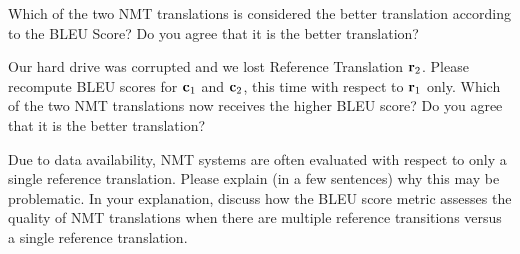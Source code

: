 \begin{parts}
\begin{subparts}
        Which of the two NMT translations is considered the better translation according to the BLEU Score? Do you agree that it is the better translation?
        
        \subpart[5] Our hard drive was corrupted and we lost Reference Translation $\mathbf{r}_2$. Please recompute BLEU scores for $\mathbf{c}_1$ and $\mathbf{c}_2$, this time with respect to $\mathbf{r}_1$ only. Which of the two NMT translations now receives the higher BLEU score? Do you agree that it is the better translation?
        
        \subpart[2] Due to data availability, NMT systems are often evaluated with respect to only a single reference translation. Please explain (in a few sentences) why this may be problematic. In your explanation, discuss how the BLEU score metric assesses the quality of NMT translations when there are multiple reference transitions versus a single reference translation.
        

\end{subparts}
\end{parts}
